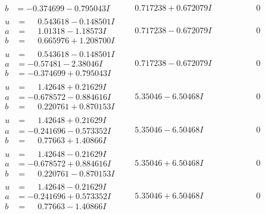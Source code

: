 \documentclass[1p]{elsarticle_modified}
\theoremstyle{definition}
\begin{document}
$$\begin{array}{c|c|c}
\begin{aligned}
b &= -0.374699 - 0.795043 I\end{aligned}
 & \phantom{-}0.717238 + 0.672079 I & \phantom{-0.000000 } 0 \\ \hline\begin{aligned}
u &= \phantom{-}0.543618 - 0.148501 I \\
a &= \phantom{-}1.01318 - 1.18573 I \\
b &= \phantom{-}0.665976 + 1.208700 I\end{aligned}
 & \phantom{-}0.717238 - 0.672079 I & \phantom{-0.000000 } 0 \\ \hline\begin{aligned}
u &= \phantom{-}0.543618 - 0.148501 I \\
a &= -0.57481 - 2.38046 I \\
b &= -0.374699 + 0.795043 I\end{aligned}
 & \phantom{-}0.717238 - 0.672079 I & \phantom{-0.000000 } 0 \\ \hline\begin{aligned}
u &= \phantom{-}1.42648 + 0.21629 I \\
a &= -0.678572 - 0.884616 I \\
b &= \phantom{-}0.220761 + 0.870153 I\end{aligned}
 & \phantom{-}5.35046 - 6.50468 I & \phantom{-0.000000 } 0 \\ \hline\begin{aligned}
u &= \phantom{-}1.42648 + 0.21629 I \\
a &= -0.241696 - 0.573352 I \\
b &= \phantom{-}0.77663 + 1.40866 I\end{aligned}
 & \phantom{-}5.35046 - 6.50468 I & \phantom{-0.000000 } 0 \\ \hline\begin{aligned}
u &= \phantom{-}1.42648 - 0.21629 I \\
a &= -0.678572 + 0.884616 I \\
b &= \phantom{-}0.220761 - 0.870153 I\end{aligned}
 & \phantom{-}5.35046 + 6.50468 I & \phantom{-0.000000 } 0 \\ \hline\begin{aligned}
u &= \phantom{-}1.42648 - 0.21629 I \\
a &= -0.241696 + 0.573352 I \\
b &= \phantom{-}0.77663 - 1.40866 I\end{aligned}
 & \phantom{-}5.35046 + 6.50468 I & \phantom{-0.000000 } 0\\

\end{array}$$
\end{document}
